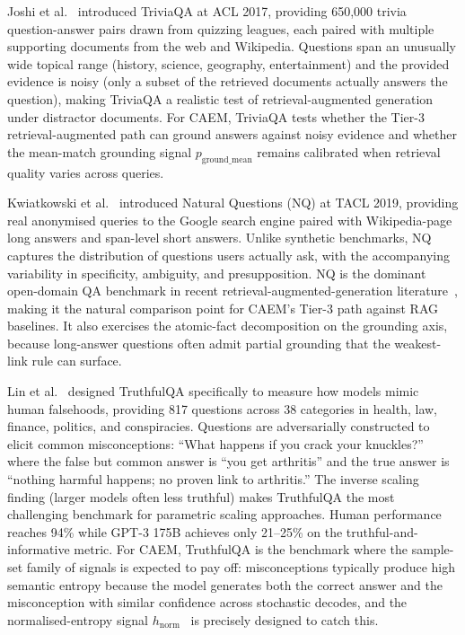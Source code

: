 Joshi et al.~\cite{joshi-etal-2017-triviaqa} introduced TriviaQA at ACL 2017, providing 650{,}000 trivia question-answer pairs drawn from quizzing leagues, each paired with multiple supporting documents from the web and Wikipedia. Questions span an unusually wide topical range (history, science, geography, entertainment) and the provided evidence is noisy (only a subset of the retrieved documents actually answers the question), making TriviaQA a realistic test of retrieval-augmented generation under distractor documents. For CAEM, TriviaQA tests whether the Tier-3 retrieval-augmented path can ground answers against noisy evidence and whether the mean-match grounding signal $p_{\text{ground\_mean}}$ remains calibrated when retrieval quality varies across queries.

Kwiatkowski et al.~\cite{kwiatkowski-etal-2019-natural} introduced Natural Questions (NQ) at TACL 2019, providing real anonymised queries to the Google search engine paired with Wikipedia-page long answers and span-level short answers. Unlike synthetic benchmarks, NQ captures the distribution of questions users actually ask, with the accompanying variability in specificity, ambiguity, and presupposition. NQ is the dominant open-domain QA benchmark in recent retrieval-augmented-generation literature~\cite{NEURIPS2020_6b493230, karpukhin-etal-2020-dense}, making it the natural comparison point for CAEM's Tier-3 path against RAG baselines. It also exercises the atomic-fact decomposition on the grounding axis, because long-answer questions often admit partial grounding that the weakest-link rule can surface.

Lin et al.~\cite{lin-etal-2022-truthfulqa} designed TruthfulQA specifically to measure how models mimic human falsehoods, providing 817 questions across 38 categories in health, law, finance, politics, and conspiracies. Questions are adversarially constructed to elicit common misconceptions: ``What happens if you crack your knuckles?'' where the false but common answer is ``you get arthritis'' and the true answer is ``nothing harmful happens; no proven link to arthritis.'' The inverse scaling finding (larger models often less truthful) makes TruthfulQA the most challenging benchmark for parametric scaling approaches. Human performance reaches 94\% while GPT-3 175B achieves only 21--25\% on the truthful-and-informative metric. For CAEM, TruthfulQA is the benchmark where the sample-set family of signals is expected to pay off: misconceptions typically produce high semantic entropy because the model generates both the correct answer and the misconception with similar confidence across stochastic decodes, and the normalised-entropy signal $h_{\text{norm}}$~\cite{farquhar2024semantic} is precisely designed to catch this.

